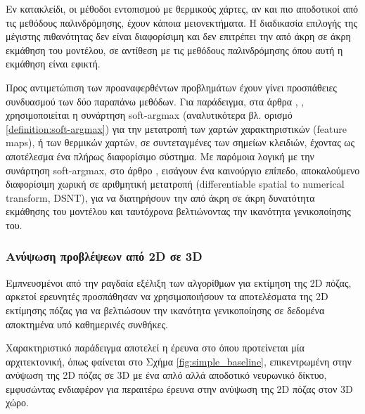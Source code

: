 Εν κατακλείδι, οι μέθοδοι εντοπισμού με θερμικούς χάρτες, αν και πιο αποδοτικοί από τις μεθόδους παλινδρόμησης, έχουν κάποια μειονεκτήματα. Η διαδικασία επιλογής της μέγιστης πιθανότητας δεν είναι διαφορίσιμη και δεν επιτρέπει την από άκρη σε άκρη εκμάθηση του μοντέλου, σε αντίθεση με τις μεθόδους παλινδρόμησης όπου αυτή η εκμάθηση είναι εφικτή.

Προς αντιμετώπιση των προαναφερθέντων προβλημάτων έχουν γίνει προσπάθειες συνδυασμού των δύο παραπάνω μεθόδων. Για παράδειγμα, στα άρθρα \cite{human_pose_regression_paper}, \cite{margipose_paper}, χρησιμοποιείται η συνάρτηση soft-argmax (αναλυτικότερα βλ. ορισμό \ref{definition:soft-argmax}) για την μετατροπή των χαρτών χαρακτηριστικών (feature maps), ή των θερμικών χαρτών, σε συντεταγμένες των σημείων κλειδιών, έχοντας ως αποτέλεσμα ένα πλήρως διαφορίσιμο σύστημα. Με παρόμοια λογική με την συνάρτηση soft-argmax, στο άρθρο \cite{numerical_coordinate_regression_paper}, εισάγουν ένα καινούργιο επίπεδο, αποκαλούμενο διαφορίσιμη χωρική σε αριθμητική μετατροπή (differentiable spatial to numerical transform, DSNT), για να διατηρήσουν την από άκρη σε άκρη δυνατότητα εκμάθησης του μοντέλου και ταυτόχρονα βελτιώνοντας την ικανότητα γενικοποίησης του. 

\subsubsection{Ανύψωση προβλέψεων από 2D σε 3D }

Εμπνευσμένοι από την ραγδαία εξέλιξη των αλγορίθμων για εκτίμηση της 2D πόζας, αρκετοί ερευνητές προσπάθησαν να χρησιμοποιήσουν τα αποτελέσματα της 2D εκτίμησης πόζας για να βελτιώσουν την ικανότητα γενικοποίησης σε δεδομένα αποκτημένα υπό καθημερινές συνθήκες. 

Χαρακτηριστικό παράδειγμα αποτελεί η έρευνα στο \cite{simple_baseline_pose_estimation} όπου προτείνεται μία αρχιτεκτονική, όπως φαίνεται στο Σχήμα \ref{fig:simple_baseline}, επικεντρωμένη στην ανύψωση της 2D πόζας σε 3D με ένα απλό αλλά αποδοτικό νευρωνικό δίκτυο, εμφυσώντας ενδιαφέρον για περαιτέρω έρευνα στην ανύψωση της 2D πόζας στον 3D χώρο.

